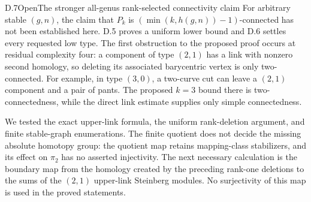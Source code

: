 \begin{result}{D.7}{Open}{The stronger all-genus rank-selected connectivity claim}
For arbitrary stable $(g,n)$, the claim that $P_k$ is $(\min(k,h(g,n))-1)$-connected has not been established here. D.5 proves a uniform lower bound and D.6 settles every requested low type. The first obstruction to the proposed proof occurs at residual complexity four: a component of type $(2,1)$ has a link with nonzero second homology, so deleting its associated barycentric vertex is only two-connected. For example, in type $(3,0)$, a two-curve cut can leave a $(2,1)$ component and a pair of pants. The proposed $k=3$ bound there is two-connectedness, while the direct link estimate supplies only simple connectedness.
\end{result}

We tested the exact upper-link formula, the uniform rank-deletion argument, and finite stable-graph enumerations. The finite quotient does not decide the missing absolute homotopy group: the quotient map retains mapping-class stabilizers, and its effect on $\pi_2$ has no asserted injectivity. The next necessary calculation is the boundary map from the homology created by the preceding rank-one deletions to the sums of the $(2,1)$ upper-link Steinberg modules. No surjectivity of this map is used in the proved statements.











